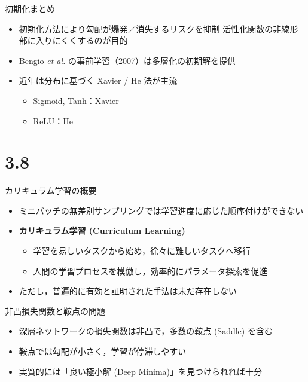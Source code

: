 \documentclass[dvipdfmx,autodetect-engine]{beamer}
\begin{document}
\begin{frame}{初期化まとめ}
  \begin{itemize}
    \item 初期化方法により勾配が爆発／消失するリスクを抑制  
      活性化関数の非線形部に入りにくくするのが目的
    \item Bengio \textit{et al.} の事前学習（2007）は多層化の初期解を提供
    \item 近年は分布に基づく Xavier / He 法が主流  
      \begin{itemize}
        \item Sigmoid, Tanh：Xavier
        \item ReLU：He
      \end{itemize}
  \end{itemize}
\end{frame}

\section{3.8}
\begin{frame}{カリキュラム学習の概要}
  \begin{itemize}
    \item ミニバッチの無差別サンプリングでは学習進度に応じた順序付けができない
    \item \textbf{カリキュラム学習 (Curriculum Learning)}
      \begin{itemize}
        \item 学習を易しいタスクから始め，徐々に難しいタスクへ移行
        \item 人間の学習プロセスを模倣し，効率的にパラメータ探索を促進
      \end{itemize}
    \item ただし，普遍的に有効と証明された手法は未だ存在しない
  \end{itemize}
\end{frame}

\begin{frame}{非凸損失関数と鞍点の問題}
  \begin{itemize}
    \item 深層ネットワークの損失関数は非凸で，多数の鞍点 (Saddle) を含む
    \item 鞍点では勾配が小さく，学習が停滞しやすい
    \item 実質的には「良い極小解 (Deep Minima)」を見つけられれば十分
  \end{itemize}
\end{frame}
\end{document}
